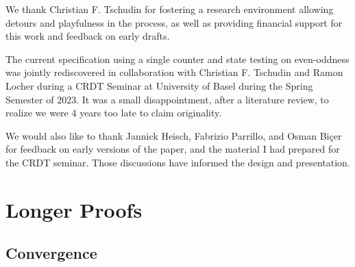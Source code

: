 \documentclass[10pt, oneside]{article}   	%
\begin{document}
We thank Christian F. Tschudin for fostering a research environment allowing detours and playfulness in the process, as well as providing financial support for this work and feedback on early drafts. 

The current specification using a single counter and state testing on even-oddness was jointly rediscovered in collaboration with Christian F. Tschudin and Ramon Locher during a CRDT Seminar at University of Basel during the Spring Semester of 2023. It was a small disappointment, after a literature review, to realize we were 4 years too late to claim originality.

We would also like to thank Jannick Heisch, Fabrizio Parrillo, and Osman Biçer for feedback on early versions of the paper, and the material I had prepared for the CRDT seminar. Those discussions have informed the design and presentation.

\newpage




\newpage
\appendix

\section{Longer Proofs}

\subsection{Convergence}
\label{sec:longer-proofs:convergence}
\end{document}
